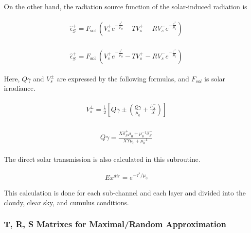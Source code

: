 On the other hand, the radiation source function of the solar-induced
radiation is

\begin{eqnarray}
\begin{array}{l}
\hat{\epsilon}_{S}^{+}=F_{\text {sol }}\left(V_{s}^{+} e^{-\frac{\tau^{*}}{\mu_{0}}}-T V_{s}^{+}-R V_{s}^{-} e^{-\frac{\tau^{*}}{\mu_{0}}}\right)
\end{array}
\end{eqnarray}

\begin{eqnarray}
\begin{array}{l}
\hat{\epsilon}_{S}^{+}=F_{\text {sol }}\left(V_{s}^{+} e^{-\frac{\tau^{*}}{\mu_{0}}}-T V_{s}^{+}-R V_{s}^{-} e^{-\frac{\tau^{*}}{\mu_{0}}}\right)
\end{array}
\end{eqnarray}

Here, \(Q \gamma\) and \(V_{s}^{\pm}\) are expressed by the following
formulas, and \(F_{sol}\) is solar irradiance.

\begin{eqnarray}
\begin{array}{c}
V_{s}^{\pm}=\frac{1}{2}\left[Q \gamma \pm\left(\frac{Q \gamma}{\mu_{0}}+\frac{\hat{\sigma}_{S}^{-}}{X}\right)\right]
\end{array}
\end{eqnarray}

\begin{eqnarray}
\begin{array}{c}
Q \gamma=\frac{X \hat{\sigma}_{S}^{+} \mu_{0}+\mu_{0}^{-1} \hat{\sigma}_{S}^{-}}{X Y \mu_{0}+\mu_{0}^{-1}}
\end{array}
\end{eqnarray}

The direct solar transmission is also calculated in this subroutine.

\begin{eqnarray}
E x^{d i r}=e^{-\tau^{*}/ \mu_{0}}
\end{eqnarray}

This calculation is done for each sub-channel and each layer and divided
into the cloudy, clear sky, and cumulus conditions.

\hypertarget{t-r-s-matrixes-for-maximalrandom-approximation}{%
\subsubsection{T, R, S Matrixes for Maximal/Random
Approximation}\label{t-r-s-matrixes-for-maximalrandom-approximation}}

